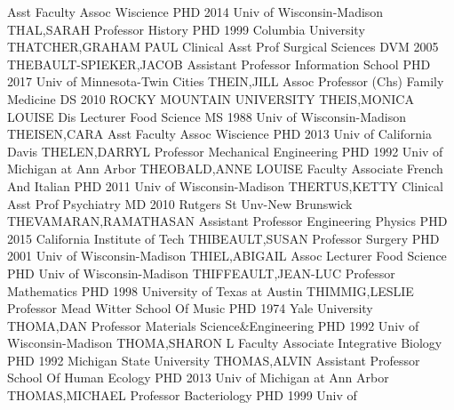 \documentclass[
]{article}
\begin{document}
\textbar Asst Faculty Assoc \textbar Wiscience \textbar PHD 2014 Univ of
Wisconsin-Madison \textbar THAL,SARAH \textbar{} 
\textbar Professor \textbar History \textbar PHD 1999 Columbia
University \textbar THATCHER,GRAHAM PAUL \textbar{} 
\textbar Clinical Asst Prof \textbar Surgical Sciences \textbar DVM 2005
\textbar THEBAULT-SPIEKER,JACOB \textbar{} 
\textbar Assistant Professor \textbar Information School \textbar PHD
2017 Univ of Minnesota-Twin Cities \textbar THEIN,JILL \textbar{}
 \textbar Assoc Professor (Chs) \textbar Family Medicine
\textbar DS 2010 ROCKY MOUNTAIN UNIVERSITY \textbar THEIS,MONICA LOUISE
\textbar{}  \textbar Dis Lecturer \textbar Food Science
\textbar MS 1988 Univ of Wisconsin-Madison \textbar THEISEN,CARA
\textbar{}  \textbar Asst Faculty Assoc \textbar Wiscience
\textbar PHD 2013 Univ of California Davis \textbar THELEN,DARRYL
\textbar{}  \textbar Professor \textbar Mechanical
Engineering \textbar PHD 1992 Univ of Michigan at Ann Arbor
\textbar THEOBALD,ANNE LOUISE \textbar{}  \textbar Faculty
Associate \textbar French And Italian \textbar PHD 2011 Univ of
Wisconsin-Madison \textbar THERTUS,KETTY \textbar{} 
\textbar Clinical Asst Prof \textbar Psychiatry \textbar MD 2010 Rutgers
St Unv-New Brunswick \textbar THEVAMARAN,RAMATHASAN \textbar{}
 \textbar Assistant Professor \textbar Engineering Physics
\textbar PHD 2015 California Institute of Tech \textbar THIBEAULT,SUSAN
\textbar{}  \textbar Professor \textbar Surgery \textbar PHD
2001 Univ of Wisconsin-Madison \textbar THIEL,ABIGAIL \textbar{}
 \textbar Assoc Lecturer \textbar Food Science \textbar PHD
Univ of Wisconsin-Madison \textbar THIFFEAULT,JEAN-LUC \textbar{}
 \textbar Professor \textbar Mathematics \textbar PHD 1998
University of Texas at Austin \textbar THIMMIG,LESLIE \textbar{}
 \textbar Professor \textbar Mead Witter School Of Music
\textbar PHD 1974 Yale University \textbar THOMA,DAN \textbar{}
 \textbar Professor \textbar Materials Science\&Engineering
\textbar PHD 1992 Univ of Wisconsin-Madison \textbar THOMA,SHARON L
\textbar{}  \textbar Faculty Associate \textbar Integrative
Biology \textbar PHD 1992 Michigan State University
\textbar THOMAS,ALVIN \textbar{}  \textbar Assistant
Professor \textbar School Of Human Ecology \textbar PHD 2013 Univ of
Michigan at Ann Arbor \textbar THOMAS,MICHAEL \textbar{} 
\textbar Professor \textbar Bacteriology \textbar PHD 1999 Univ of
\end{document}
